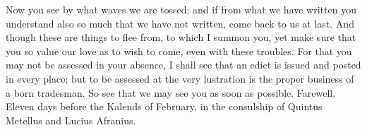  Now you see by what waves we are tossed; and if from what we have written you understand also so much that we have not written, come back to us at last. And though these are things to flee from, to which I summon you, yet make sure that you so value our love as to wish to come, even with these troubles. For that you may not be assessed in your absence, I shall see that an edict is issued and posted in every place; but to be assessed at the very lustration is the proper business of a born tradesman. So see that we may see you as soon as possible. Farewell. Eleven days before the Kalends of February, in the consulship of Quintus Metellus and Lucius Afranius.
